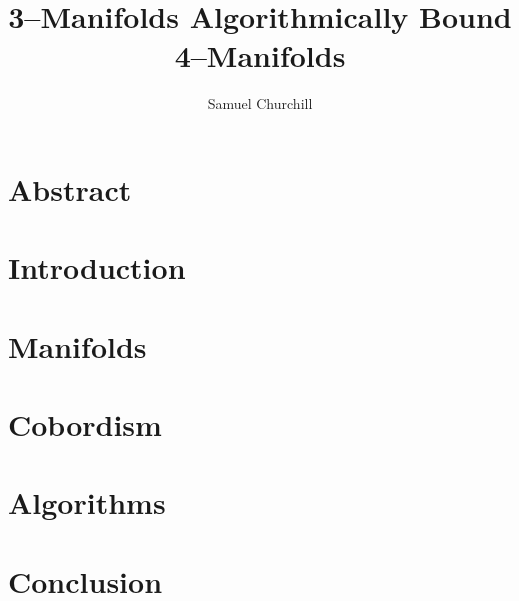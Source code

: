 \documentclass[12pt]{report}
\author{Samuel Churchill}
\title{3--Manifolds Algorithmically Bound 4--Manifolds}
\begin{document}
\maketitle

\chapter*{Abstract}

\tableofcontents

\chapter{Introduction}


\chapter{Manifolds}


\chapter{Cobordism}


\chapter{Algorithms}
\label{cha:algorithm}


\chapter{Conclusion}



% 

{}

\end{document}
